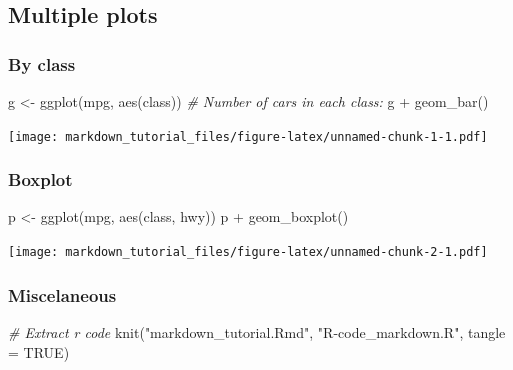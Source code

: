 \documentclass[
]{article}
\newenvironment{Shaded}{\begin{snugshade}}{\end{snugshade}}
\newcommand{\AttributeTok}[1]{\textcolor[rgb]{0.77,0.63,0.00}{#1}}
\newcommand{\CommentTok}[1]{\textcolor[rgb]{0.56,0.35,0.01}{\textit{#1}}}
\newcommand{\ConstantTok}[1]{\textcolor[rgb]{0.00,0.00,0.00}{#1}}
\newcommand{\FunctionTok}[1]{\textcolor[rgb]{0.00,0.00,0.00}{#1}}
\newcommand{\NormalTok}[1]{#1}
\newcommand{\OtherTok}[1]{\textcolor[rgb]{0.56,0.35,0.01}{#1}}
\newcommand{\SpecialCharTok}[1]{\textcolor[rgb]{0.00,0.00,0.00}{#1}}
\newcommand{\StringTok}[1]{\textcolor[rgb]{0.31,0.60,0.02}{#1}}
\begin{document}
\hypertarget{multiple-plots}{%
\subsection{Multiple plots}\label{multiple-plots}}

\hypertarget{by-class}{%
\subsubsection{By class}\label{by-class}}

\begin{Shaded}
\begin{Highlighting}[]
\NormalTok{g }\OtherTok{\textless{}{-}} \FunctionTok{ggplot}\NormalTok{(mpg, }\FunctionTok{aes}\NormalTok{(class))}
\CommentTok{\# Number of cars in each class:}
\NormalTok{g }\SpecialCharTok{+} \FunctionTok{geom\_bar}\NormalTok{()}
\end{Highlighting}
\end{Shaded}

\texttt{[image: markdown\_tutorial\_files/figure-latex/unnamed-chunk-1-1.pdf]}

\hypertarget{boxplot}{%
\subsubsection{Boxplot}\label{boxplot}}

\begin{Shaded}
\begin{Highlighting}[]
\NormalTok{p }\OtherTok{\textless{}{-}} \FunctionTok{ggplot}\NormalTok{(mpg, }\FunctionTok{aes}\NormalTok{(class, hwy))}
\NormalTok{p }\SpecialCharTok{+} \FunctionTok{geom\_boxplot}\NormalTok{()}
\end{Highlighting}
\end{Shaded}

\texttt{[image: markdown\_tutorial\_files/figure-latex/unnamed-chunk-2-1.pdf]}

\hypertarget{miscelaneous}{%
\subsubsection{Miscelaneous}\label{miscelaneous}}

\begin{Shaded}
\begin{Highlighting}[]
\CommentTok{\# Extract r code}
\FunctionTok{knit}\NormalTok{(}\StringTok{"markdown\_tutorial.Rmd"}\NormalTok{, }\StringTok{"R{-}code\_markdown.R"}\NormalTok{, }\AttributeTok{tangle =} \ConstantTok{TRUE}\NormalTok{)}
\end{Highlighting}
\end{Shaded}
\end{document}
